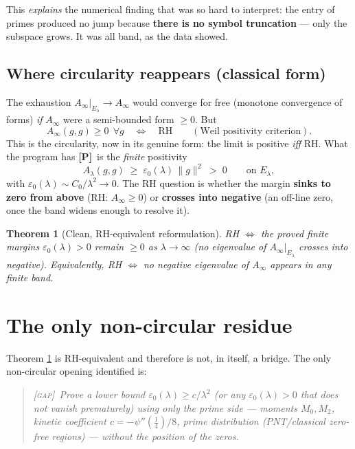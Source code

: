 \documentclass[11pt]{article}
\newcommand{\PR}{\textcolor{green!55!black}{\textbf{[P]}}}
\newcommand{\GAP}{\textcolor{red!75!black}{\textsc{[gap]}}}
\theoremstyle{plain}
\newtheorem{theorem}{Theorem}
\theoremstyle{definition}
\newcommand{\El}{E_\lambda}
\begin{document}
\noindent This \emph{explains} the numerical finding that was so hard to
interpret: the entry of primes produced no jump because \textbf{there is no
symbol truncation} --- only the subspace grows. It was all band, as the data
showed.

\subsection{Where circularity reappears (classical form)}

The exhaustion $A_\infty|_{\El}\to A_\infty$ would converge for free (monotone
convergence of forms) \emph{if} $A_\infty$ were a semi-bounded form $\ge0$. But
\[
  A_\infty(g,g)\ge0\ \ \forall g\quad\Longleftrightarrow\quad\text{RH}
  \qquad(\text{Weil positivity criterion}).
\]
This is the circularity, now in its genuine form: the limit is positive \emph{iff}
RH. What the program has \PR\ is the \emph{finite} positivity
\[
  A_\lambda(g,g)\;\ge\;\varepsilon_0(\lambda)\,\|g\|^2\;>\;0\qquad\text{on }\El,
\]
with $\varepsilon_0(\lambda)\sim C_0/\lambda^2\to0$. The RH question is whether the
margin \textbf{sinks to zero from above} (RH: $A_\infty\ge0$) or \textbf{crosses
into negative} (an off-line zero, once the band widens enough to resolve it).

\begin{theorem}[Clean, RH-equivalent reformulation]\label{thm:clean}
RH $\Longleftrightarrow$ the proved finite margins $\varepsilon_0(\lambda)>0$
remain $\ge0$ as $\lambda\to\infty$ (no eigenvalue of $A_\infty|_{\El}$ crosses
into negative). Equivalently, RH $\Longleftrightarrow$ no negative eigenvalue of
$A_\infty$ appears in any finite band.
\end{theorem}

\section{The only non-circular residue}\label{sec:residue}

Theorem \ref{thm:clean} is RH-equivalent and therefore is not, in itself, a
bridge. The only non-circular opening identified is:

\begin{quote}\itshape
\GAP\ Prove a lower bound $\varepsilon_0(\lambda)\ge c/\lambda^2$ (or any
$\varepsilon_0(\lambda)>0$ that does not vanish prematurely) using \emph{only} the
prime side --- moments $M_0,M_2$, kinetic coefficient $c=-\psi''(\tfrac14)/8$,
prime distribution (PNT/classical zero-free regions) --- without the position of
the zeros.
\end{quote}
\end{document}
